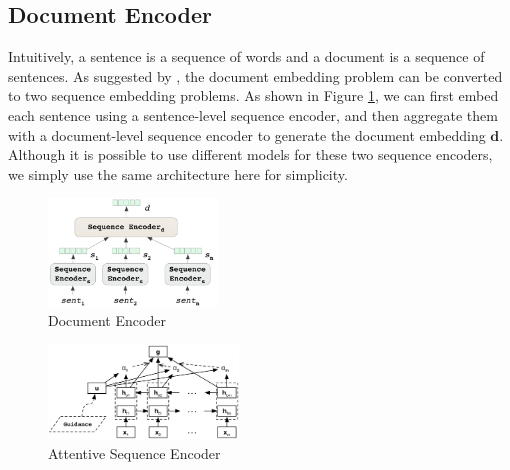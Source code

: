 \subsection{Document Encoder}
\label{sec_doc_encoder}
Intuitively, a sentence is a sequence of words and a document is a sequence of sentences. As suggested by \cite{tang2015document,yang2016hierarchical}, the document embedding problem can be converted to two sequence embedding problems. As shown in Figure \ref{fig_doc_encoder}, we can first embed each sentence using a sentence-level sequence encoder, and then aggregate them with a document-level sequence encoder to generate the document embedding $\mathbf{d}$. 
Although it is possible to use different models for these two sequence encoders, we simply use the same architecture here for simplicity.

\begin{figure}[htbp]
\begin{center}
\includegraphics[width=0.4\textwidth]{figures/document_encoder.png}	
\caption{Document Encoder}
\label{fig_doc_encoder}
\end{center}
\end{figure}

\begin{figure}[htbp]
\begin{center}
\includegraphics[width=0.45\textwidth]{figures/attentive_seq_encoder.png}	
\caption{Attentive Sequence Encoder}
\label{fig_seq_encoder}
\end{center}
\end{figure}


